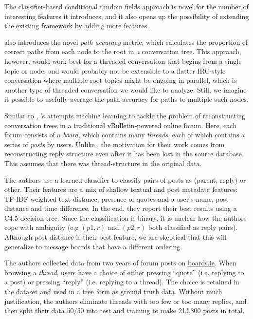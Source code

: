 \documentclass[11pt]{article}
\begin{document}
The classifier-based conditional random fields approach is novel for the number
of interesting features it introduces, and it also opens up the possibility of
extending the existing framework by adding more features.

\cite{Wang2011a} also introduces the novel \emph{path accuracy} metric, which
calculates the proportion of correct paths from each node to the root in a
conversation tree. This approach, however, would work best for a threaded
conversation that begins from a single topic or node, and would probably not be
extensible to a flatter IRC-style conversation where multiple root topics might
be ongoing in parallel, which is another type of threaded conversation we would
like to analyze. Still, we imagine it possible to usefully average the path
accuracy for paths to multiple such nodes.

Similar to \cite{Wang2011a}, \cite{Aumayr2011a}'s attempts machine learning to 
tackle the problem of reconstructing conversation trees in a traditional
vBulletin-powered online forum. Here, each forum consists of a \textit{board}, which
contains many \textit{threads}, each of which contains a series of
\textit{posts} by users. Unlike \cite{Wang2008a}, the motivation for their work
comes from reconstructing reply structure even after it has been lost in the
source database. This assumes that there was thread-structure in the original
data.

The authors use a learned classifier to classify pairs of posts as (parent,
reply) or other. Their features are a mix of shallow textual and post
metadata features: TF-IDF weighted text distance, presence of quotes and a
user's name, post-distance and time difference. In the end, they report their 
best results using a C4.5 decision tree. Since the classification is binary, it 
is unclear how the authors cope with ambiguity (e.g $(p1, r)$ and $(p2,r)$ both 
classified as reply pairs). Although post distance is their best feature, we are skeptical
that this will generalize to message boards that have a different ordering.

The authors collected data from two years of forum posts on
\url{boards.ie}. When browsing a \textit{thread}, users have a choice of either
pressing ``quote'' (i.e. replying to a post) or pressing ``reply'' (i.e.
replying to a thread). The choice is retained in the dataset and used in a
tree form as ground truth data. Without much justification, the authors eliminate
threads with too few or too many replies, and then split their data 50/50 into 
test and training to make 213,800 posts in total.
\end{document}
